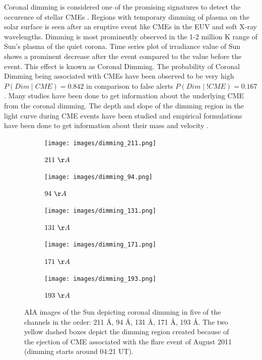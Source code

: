 \message{ !name(main.tex)}\documentclass[12pt]{article}
\begin{document}
Coronal dimming is considered one of the promising signatures to detect the occurence of stellar CMEs \citep{Namekata2022-dm}. Regions with temporary dimming of plasma on the solar surface is seen after an eruptive event like CMEs in the EUV and soft X-ray wavelengths. Dimming is most prominently observed in the 1-2 million K range of Sun's plasma of the quiet corona. Time series plot of irradiance value of Sun shows a prominent decrease after the event compared to the value before the event. This effect is known as Coronal Dimming. The probability of Coronal Dimming being associated with CMEs have been observed to be very high $P(Dim \mid CME) = 0.842$ in comparison to false alerts $P(Dim \mid !CME) = 0.167$ \citep{Veronig2021-rf}. Many studies have been done to get information about the underlying CME from the coronal dimming. The depth and slope of the dimming region in the light curve during CME events have been studied and empirical formulations have been done to get information about their mass and velocity \citep{Mason2016}.\\

\begin{figure}[h!]

    \begin{subfigure}[b]{0.3\textwidth}
        \centering
        \texttt{[image: images/dimming\_211.png]}
        \caption{$211 \ \AA$}
        \label{fig:dimming_211}
    \end{subfigure}
    \hfill
    \begin{subfigure}[b]{0.3\textwidth}
        \centering
        \texttt{[image: images/dimming\_94.png]}
        \caption{$94 \ \AA$}
        \label{fig:dimming_94}
    \end{subfigure}
    \hfill
    \begin{subfigure}[b]{0.3\textwidth}
        \centering
        \texttt{[image: images/dimming\_131.png]}
        \caption{$131 \ \AA$}
        \label{fig:dimming_131}
    \end{subfigure}

    \hfill
    \begin{subfigure}[b]{0.3\textwidth}
        \centering
        \texttt{[image: images/dimming\_171.png]}
        \caption{$171 \ \AA$}
        \label{fig:dimming_171}
    \end{subfigure}
    \hspace{0.5cm}
    \begin{subfigure}[b]{0.3\textwidth}
        \centering
        \texttt{[image: images/dimming\_193.png]}
        \caption{$193 \ \AA$}
        \label{fig:dimming_193}
    \end{subfigure}
    \hfill
    \label{fig:dimming_5_channels}
    \caption[AIA images of Coronal Dimming regions on the Sun]{AIA images of the Sun depicting coronal dimming in five of the channels in the order: 211 \AA, 94 \AA, 131 \AA, 171 \AA, 193 \AA. The two yellow dashed boxes depict the dimming region created because of the ejection of CME associated with the flare event of  August 2011 (dimming starts around 04:21 UT).}
\end{figure}
\end{document}
